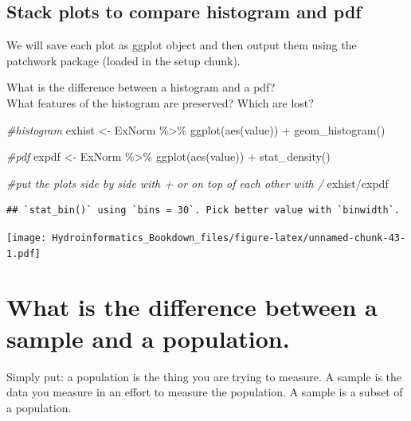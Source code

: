 \documentclass[
]{book}
\newenvironment{Shaded}{\begin{snugshade}}{\end{snugshade}}
\newcommand{\CommentTok}[1]{\textcolor[rgb]{0.56,0.35,0.01}{\textit{#1}}}
\newcommand{\FunctionTok}[1]{\textcolor[rgb]{0.00,0.00,0.00}{#1}}
\newcommand{\NormalTok}[1]{#1}
\newcommand{\OtherTok}[1]{\textcolor[rgb]{0.56,0.35,0.01}{#1}}
\newcommand{\SpecialCharTok}[1]{\textcolor[rgb]{0.00,0.00,0.00}{#1}}
\begin{document}
\hypertarget{stack-plots-to-compare-histogram-and-pdf}{%
\subsection{Stack plots to compare histogram and pdf}\label{stack-plots-to-compare-histogram-and-pdf}}

We will save each plot as ggplot object and then output them using the patchwork package (loaded in the setup chunk).

What is the difference between a histogram and a pdf?\\
What features of the histogram are preserved? Which are lost?

\begin{Shaded}
\begin{Highlighting}[]
\CommentTok{\#histogram}
\NormalTok{exhist }\OtherTok{\textless{}{-}}\NormalTok{ ExNorm }\SpecialCharTok{\%\textgreater{}\%}
  \FunctionTok{ggplot}\NormalTok{(}\FunctionTok{aes}\NormalTok{(value)) }\SpecialCharTok{+}
  \FunctionTok{geom\_histogram}\NormalTok{()}

\CommentTok{\#pdf}
\NormalTok{expdf }\OtherTok{\textless{}{-}}\NormalTok{ ExNorm }\SpecialCharTok{\%\textgreater{}\%}
  \FunctionTok{ggplot}\NormalTok{(}\FunctionTok{aes}\NormalTok{(value)) }\SpecialCharTok{+}
  \FunctionTok{stat\_density}\NormalTok{()}

\CommentTok{\#put the plots side by side with + or on top of each other with /}
\NormalTok{exhist}\SpecialCharTok{/}\NormalTok{expdf}
\end{Highlighting}
\end{Shaded}

\begin{verbatim}
## `stat_bin()` using `bins = 30`. Pick better value with `binwidth`.
\end{verbatim}

\texttt{[image: Hydroinformatics\_Bookdown\_files/figure-latex/unnamed-chunk-43-1.pdf]}

\hypertarget{what-is-the-difference-between-a-sample-and-a-population.}{%
\section{What is the difference between a sample and a population.}\label{what-is-the-difference-between-a-sample-and-a-population.}}

Simply put: a population is the thing you are trying to measure. A sample is the data you measure in an effort to measure the population. A sample is a subset of a population.
\end{document}
